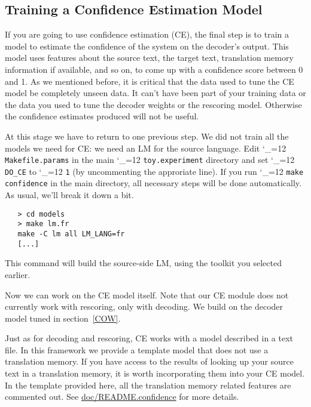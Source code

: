 \documentclass[11pt,letterpaper]{article}
\def\code{\begingroup\catcode`\_=12 \codex}
\newcommand{\codex}[1]{\texttt{#1}\endgroup}
\begin{document}
\subsection{Training a Confidence Estimation Model} \label{CE}

If you are going to use confidence estimation (CE), the final step is to train a
model to estimate the confidence of the system on the decoder's output. This
model uses features about the source text, the target text, translation memory
information if available, and so on, to come up with a confidence score between
0 and 1. As we mentioned before, it is critical that the data used to tune the
CE model be completely unseen data. It can't have been part of your training
data or the data you used to tune the decoder weights or the rescoring model.
Otherwise the confidence estimates produced will not be useful.

At this stage we have to return to one previous step. We did not train all
the models we need for CE: we need an LM for the source language. Edit
\code{Makefile.params} in the main \code{toy.experiment} directory and set 
\code{DO_CE} to \code{1} (by uncommenting the approriate line). If you run
\code{make confidence} in the main directory, all necessary steps will be done 
automatically.  As usual, we'll break it down a bit.
\begin{small}
\begin{verbatim}
   > cd models
   > make lm.fr
   make -C lm all LM_LANG=fr
   [...]
\end{verbatim}
\end{small}
This command will build the source-side LM, using the toolkit you selected
earlier.

Now we can work on the CE model itself. Note that our CE module does not
currently work with rescoring, only with decoding. We build on the decoder
model tuned in section~\ref{COW}.  

Just as for decoding and rescoring, CE works with a model described in a text
file.  In this framework we provide a template model that does not use a
translation memory.  If you have access to the results of looking up your
source text in a translation memory, it is worth incorporating them into your
CE model.  In the template provided here, all the translation memory related
features are commented out.  See \url{doc/README.confidence} for more
details.
\end{document}
